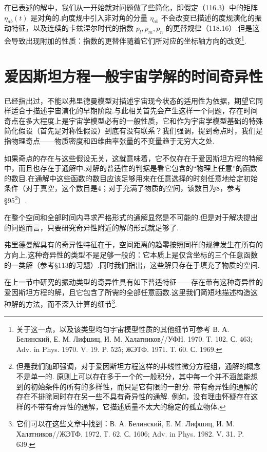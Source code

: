 在已表述的解中，我们从一开始就对问题做了些简化，即假定（116.3）中的矩阵 $\eta_{ab}(t)$ 是对角的.向度规中引入非对角的分量 $\eta_{ab}$ 不会改变已描述的度规演化的振动特征，以及连续的卡兹涅尔时代的指数 $p_{l},p_{m},p_{n}$ 的更替规律（118.16）.但是这会导致出现附加的性质：指数的更替伴随着它们所对应的坐标轴方向的改变\footnote{关于这一点，以及该类型均匀宇宙模型性质的其他细节可参考 В. А. Белинский, Е. М. Лифшиц, И. М. Халатников//УФН. 1970. Т. 102. С. 463; Adv. in Phys. 1970. V. 19. P. 525; ЖЭТФ. 1971. Т. 60. С. 1969.}.

\section{爱因斯坦方程一般宇宙学解的时间奇异性}

已经指出过，不能以弗里德曼模型对描述宇宙现今状态的适用性为依据，期望它同样适合于描述宇宙演化的早期阶段.与此相关首先会产生这样一个问题，存在时间奇点在多大程度上是宇宙学模型必有的一般性质，它和作为宇宙学模型基础的特殊简化假设（首先是对称性假设）到底有没有联系？我们强调，提到奇点时，我们是指物理奇点——物质密度和四维曲率张量的不变量趋于无穷大之处.

如果奇点的存在与这些假设无关，这就意味着，它不仅存在于爱因斯坦方程的特解中，而且也存在于通解中.对解的普适性的判据是看它包含的“物理上任意”的函数的数目.在通解中这些函数的数目应该足够用来在任意选择的时刻任意地给定初始条件（对于真空，这个数目是4；对于充满了物质的空间，该数目为8，参考§95\footnote{但是我们随即强调，对于爱因斯坦方程这样的非线性微分方程组，通解的概念不是单一的. 原则上可以存在多于一个的一般积分，其中每一个并不涵盖能想到的初始条件的所有的多样性，而只是它有限的一部分. 带有奇异性的通解的存在不排除同时存在另一些不具有奇异性的通解. 例如，没有理由怀疑存在这样的不带有奇异性的通解，它描述质量不太大的稳定的孤立物体.}）.

在整个空间和全部时间内寻求严格形式的通解显然是不可能的.但是对于解决提出的问题而言，只要研究奇异性附近的解的形式就足够了.

弗里德曼解具有的奇异性特征在于，空间距离的趋零按照同样的规律发生在所有的方向上.这种奇异性的类型不是足够一般的：它本质上是仅含坐标的三个任意函数的一类解（参考§113的习题）.同时我们指出，这些解只存在于填充了物质的空间.

在上一节中研究的振动类型的奇异性具有如下普适特征——存在带有这种奇异性的爱因斯坦方程的解，且它包含了所需的全部任意函数.这里我们简短地描述构造这种解的方法，而不深入计算的细节\footnote{它们可以在这些文章中找到：В. А. Белинский, Е. М. Лифшиц, И. М. Халатников//ЖЭТФ. 1972. Т. 62. С. 1606; Adv. in Phys. 1982. V. 31. P. 639.}.

